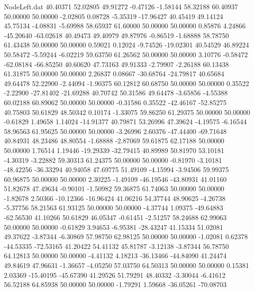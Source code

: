 \begin{filecontents}{NodeLeft.dat}
  40.40371   52.02805   49.91272    -0.47126   -1.58144   58.32188   60.40937   50.00000   50.00000   -2.02805    0.08728   -5.35319  -17.96427
  40.45419   49.14124   45.75134    -4.08831   -5.69988   58.65937   61.60000   50.00000   50.00000    0.85876    4.24866  -45.20640  -63.02618
  40.49473   49.40979   49.87976    -0.86519   -1.68888   58.78750   61.43438   50.00000   50.00000    0.59021    0.12024   -9.74526  -19.02301
  40.54529   46.89224   50.58472    -5.59244   -6.02219   59.63750   61.26562   50.00000   50.00000    3.10776   -0.58472  -62.08184  -66.85250
  40.60620   47.73163   49.91333    -2.79907   -2.26188   60.13438   61.31875   50.00000   50.00000    2.26837    0.08667  -30.68764  -24.79817
  40.65684   49.64478   52.22900    -2.44094   -1.90375   60.12812   60.68750   50.00000   50.00000    0.35522   -2.22900  -27.81402  -21.69288
  40.70742   50.31586   49.64478    -3.65856   -4.55388   60.02188   60.89062   50.00000   50.00000   -0.31586    0.35522  -42.46167  -52.85275
  40.75803   50.61829   48.50342     0.10174   -1.33075   59.86250   61.29375   50.00000   50.00000   -0.61829    1.49658    1.14024  -14.91377
  40.79871   53.26996   47.39624    -4.19575   -6.16544   58.96563   61.95625   50.00000   50.00000   -3.26996    2.60376  -47.44400  -69.71648
  40.84931   48.23486   48.80554    -1.68888   -2.87069   59.61875   62.17188   50.00000   50.00000    1.76514    1.19446  -19.29339  -32.79415
  40.89989   50.81970   53.10181    -4.30319   -3.22882   59.30313   61.24375   50.00000   50.00000   -0.81970   -3.10181  -48.42256  -36.33294
  40.94058   47.69775   51.49109    -4.15994   -3.94506   59.99375   60.96875   50.00000   50.00000    2.30225   -1.49109  -46.19546  -43.80931
  41.01160   51.82678   47.49634    -0.90101   -1.50982   59.36875   61.74063   50.00000   50.00000   -1.82678    2.50366  -10.12366  -16.96424
  41.06216   54.37744   48.90625    -4.26738   -5.37756   58.21563   61.93125   50.00000   50.00000   -4.37744    1.09375  -49.64883  -62.56530
  41.10266   50.61829   46.05347    -0.61451   -2.51257   58.24688   62.99063   50.00000   50.00000   -0.61829    3.94653   -6.95381  -28.43247
  41.15334   51.02081   49.37622    -3.87344   -6.30869   57.98750   62.98125   50.00000   50.00000   -1.02081    0.62378  -44.53335  -72.53165
  41.20422   54.41132   45.81787    -3.12138   -3.87344   56.78750   64.12813   50.00000   50.00000   -4.41132    4.18213  -36.13466  -44.84090
  41.24474   49.84619   47.96631    -1.36657   -4.05250   57.03750   64.50313   50.00000   50.00000    0.15381    2.03369  -15.40195  -45.67390
  41.29526   51.79291   48.40332    -3.30044   -6.41612   56.52188   64.85938   50.00000   50.00000   -1.79291    1.59668  -36.05261  -70.08703

\end{filecontents}
